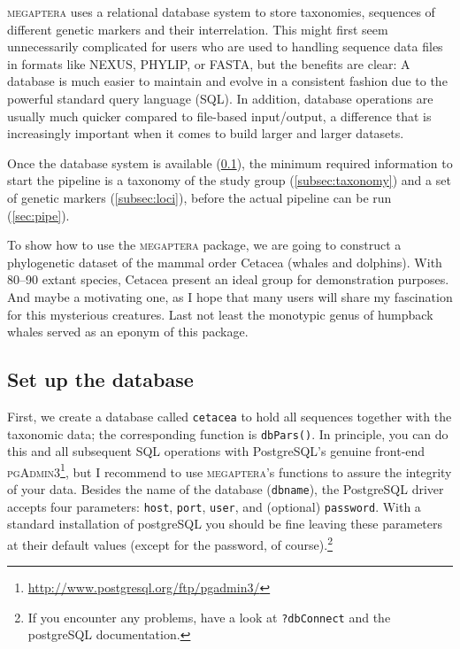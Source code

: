 \documentclass{article}
\begin{document}
\textsc{megaptera} uses a relational database system to store taxonomies, sequences of different genetic markers and their interrelation. This might first seem unnecessarily complicated for users who are used to handling sequence data files in formats like NEXUS, PHYLIP, or FASTA, but the benefits are clear: A database is much easier to maintain and evolve in a consistent fashion due to the powerful standard query language (SQL). In addition, database operations are usually much quicker compared to file-based input/output, a difference that is increasingly important when it comes to build larger and larger datasets. 

Once the database system is available (\ref{subsec:database}), the minimum required information to start the pipeline is a taxonomy of the study group (\ref{subsec:taxonomy}) and a set of genetic markers (\ref{subsec:loci}), before the actual pipeline can be run (\ref{sec:pipe}).

To show how to use the \textsc{megaptera} package, we are going to construct a phylogenetic dataset of the mammal order Cetacea (whales and dolphins). With 80--90 extant species, Cetacea present an ideal group for demonstration purposes. And maybe a motivating one, as I hope that many users will share my fascination for this mysterious creatures. Last not least the monotypic genus of humpback whales served as an eponym of this package. 

\subsection{Set up the database}\label{subsec:database}

First, we create a database called \texttt{cetacea} to hold all sequences together with the taxonomic data; the corresponding function is \texttt{dbPars()}. In principle, you can do this and all subsequent SQL operations with PostgreSQL's genuine front-end \textsc{pgAdmin3}\footnote{\href{http://www.postgresql.org/ftp/pgadmin3/}{http://www.postgresql.org/ftp/pgadmin3/}}, but I recommend to use \textsc{megaptera}'s functions to assure the integrity of your data. Besides the name of the database (\texttt{dbname}), the PostgreSQL driver accepts four parameters: \texttt{host}, \texttt{port}, \texttt{user}, and (optional) \texttt{password}. With a standard installation of postgreSQL you should be fine leaving these parameters at their default values (except for the password, of course).\footnote{If you encounter any problems, have a look at \texttt{?dbConnect} and the postgreSQL documentation.} 
\end{document}
